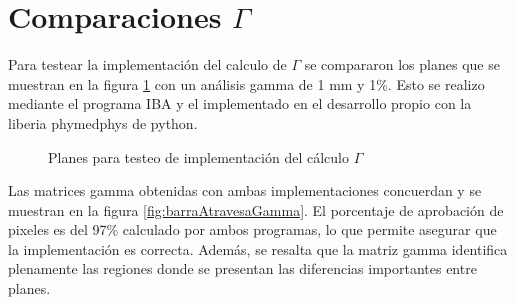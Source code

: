 \section{Comparaciones $\Gamma$}

Para testear la implementación del calculo de $\Gamma$ se compararon los planes que se muestran en la figura \ref{fig:barraAtravesa} con un análisis gamma de 1 mm y 1\%. Esto se realizo mediante el programa IBA y el implementado en el desarrollo propio con la liberia phymedphys de python.

\begin{figure}[H]
	\centering
	\hfill
	\caption{Planes para testeo de implementación del cálculo $\Gamma$}
	\label{fig:barraAtravesa}
\end{figure}

Las matrices gamma obtenidas con ambas implementaciones concuerdan y se muestran en la figura \ref{fig:barraAtravesaGamma}. El porcentaje de aprobación de pixeles es del 97\% calculado por ambos programas, lo que permite asegurar que la implementación es correcta. Además, se resalta que la matriz gamma identifica plenamente las regiones donde se presentan las diferencias importantes entre planes. 

